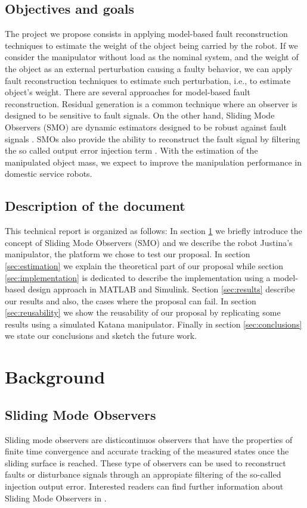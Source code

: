 \documentclass[a4paper, 10pt]{article}
\begin{document}
\subsection{Objectives and goals}
The project we propose consists in applying model-based fault reconstruction techniques \cite{ding2013model} to estimate the weight of the object being carried by the robot. If we consider the manipulator without load  as the nominal system, and the weight of the object as an external perturbation causing a faulty behavior, we can apply fault reconstruction techniques to estimate such perturbation, i.e., to estimate object's weight. There are several approaches for model-based fault reconstruction. Residual generation is a common technique where an observer is designed to be sensitive to fault signals. On the other hand, Sliding Mode Observers (SMO) are dynamic estimators designed to be robust against fault signals \cite{shtessel2014sliding}. SMOs also provide the ability to reconstruct the fault signal by filtering the so called output error injection term \cite{alwi2011fault}. With the estimation of the manipulated object mass, we expect to improve the manipulation performance in domestic service robots. 

\subsection{Description of the document}
This technical report is organized as follows: In section \ref{sec:background} we briefly introduce the concept of Sliding Mode Observers (SMO) and we describe the robot Justina's manipulator, the platform we chose to test our proposal. In section \ref{sec:estimation} we explain the theoretical part of our proposal while section \ref{sec:implementation} is dedicated to describe the implementation using a model-based design approach in MATLAB and Simulink. Section \ref{sec:results} describe our results and also, the cases where the proposal can fail. In section \ref{sec:reusability} we show the reusability of our proposal by replicating some results using a simulated Katana manipulator. Finally in section \ref{sec:conclusions} we state our conclusions and sketch the future work. 
\section{Background}
\label{sec:background}
\subsection{Sliding Mode Observers}
Sliding mode observers are disticontinuos observers that have the properties of finite time convergence and accurate tracking of the measured states once the sliding surface is reached. These type of observers can be used to reconstruct faults or disturbance signals through an appropiate filtering of the so-called injection output error. Interested readers can find further information about Sliding Mode Observers in \cite{shtessel2014sliding,davila2005second,fridman2002higher}.
\end{document}
